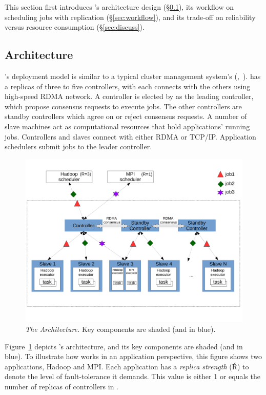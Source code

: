 This section first introduces \xxx's architecture design (\S\ref{sec:arch}), 
its workflow on scheduling jobs with replication (\S\ref{sec:workflow}), and 
its trade-off on reliability versus resource consumption (\S\ref{sec:discuss}).


\subsection{Architecture} \label{sec:arch}

\xxx's deployment model is similar to a typical cluster management system's 
(\eg,~\cite{borg:eurosys15,mesos:nsdi11}). \xxx has a replicas of three to five 
controllers, with each connects with the others using high-speed RDMA network. A 
controller is elected by \paxos as the leading controller, which propose 
consensus requests to execute jobs. The other controllers are standby 
controllers which agree on or reject consensus requests. A number of slave 
machines act as computational resources that hold applications' running jobs. 
Controllers and slaves connect with either RDMA or TCP/IP. Application 
schedulers submit jobs to the leader controller.

\begin{figure}[t]
\centering
\includegraphics[width=.47\textwidth]{figures/arch}
\vspace{-.2in}
\caption{{\em The \xxx Architecture.} Key components are shaded (and 
in blue).} \label{fig:arch}
\vspace{.05in}
\end{figure}

Figure~\ref{fig:arch} depicts \xxx's architecture, and its key components are 
shaded (and in blue). To illustrate how \xxx works in an application 
perspective, this figure shows two applications, Hadoop and MPI. Each 
application has a \emph{replica strength} (\v{R}) to denote the level of 
fault-tolerance it demands. This value is either 1 or equals the number of 
replicas of controllers in \xxx.

